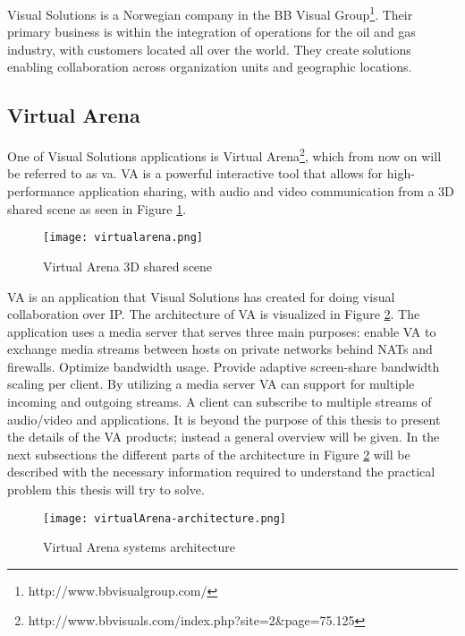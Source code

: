 Visual Solutions is a Norwegian company in the BB Visual Group\footnote{http://www.bbvisualgroup.com/}. Their primary business is within the integration of operations for the oil and gas industry, with customers located all over the world. They create solutions enabling collaboration across organization units and geographic locations.

\subsection{Virtual Arena}
One of Visual Solutions applications is Virtual Arena\footnote{http://www.bbvisuals.com/index.php?site=2\&page=75.125}, which from now on will be referred to as \gls{va}. VA is a powerful interactive tool that allows for high-performance application sharing, with audio and video communication from a 3D shared scene as seen in Figure \ref{fig:vsva-3d-scene}.
\\
\begin{figure}[here]
\centerline{\texttt{[image: virtualarena.png]}}
\caption{Virtual Arena 3D shared scene}
\label{fig:vsva-3d-scene}
\end{figure}


VA is an application that Visual Solutions has created for doing visual collaboration over IP. The architecture of VA is visualized in Figure \ref{fig:vsva-architecture}. The application uses a media server that serves three main purposes: enable VA to exchange media streams between hosts on private networks behind NATs and firewalls. Optimize bandwidth usage. Provide adaptive screen-share bandwidth scaling per client. By utilizing a media server VA can support for multiple incoming and outgoing streams. A client can subscribe to multiple streams of audio/video and applications. It is beyond the purpose of this thesis to present the details of the VA products; instead a general overview will be given. In the next subsections the different parts of the architecture in Figure \ref{fig:vsva-architecture} will be described with the necessary information required to understand the practical problem this thesis will try to solve. 

\begin{figure}[here]
\centerline{\texttt{[image: virtualArena-architecture.png]}}
\caption{Virtual Arena systems architecture}
\label{fig:vsva-architecture}
\end{figure}

